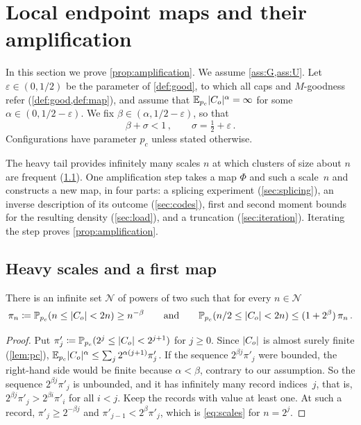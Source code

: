 \section{Local endpoint maps and their amplification}\label{sec:maps}

In this section we prove \cref{prop:amplification}. We assume \cref{ass:G,ass:U}. Let
$\varepsilon\in(0,1/2)$ be the parameter of \cref{def:good}, to which all caps and $M$-goodness refer
(\cref{def:good,def:map}), and assume that $\mathbb E_{p_c}\lvert C_o\rvert^\alpha=\infty$ for some
$\alpha\in(0,1/2-\varepsilon)$. We fix $\beta\in(\alpha,1/2-\varepsilon)$, so that
\begin{equation}\label{eq:beta-sigma}
  \beta+\sigma<1\,,\qquad\sigma=\tfrac12+\varepsilon\,.
\end{equation}
Configurations have parameter $p_c$ unless stated otherwise.

The heavy tail provides infinitely many scales $n$ at which clusters of size about $n$ are frequent
(\cref{sec:scales}). One amplification step takes a map $\Phi$ and such a scale~$n$ and constructs a new
map, in four parts: a splicing experiment (\cref{sec:splicing}), an inverse description of its outcome
(\cref{sec:codes}), first and second moment bounds for the resulting density (\cref{sec:load}), and a
truncation (\cref{sec:iteration}). Iterating the step proves \cref{prop:amplification}.

\subsection{Heavy scales and a first map}\label{sec:scales}

\begin{lemma}\label{lem:scales}
There is an infinite set $\mathcal N$ of powers of two such that for every $n\in\mathcal N$
\begin{equation}\label{eq:scales}
  \pi_n\coloneqq\mathbb P_{p_c}(n\le\lvert C_o\rvert<2n)\ge n^{-\beta}
  \qquad\text{and}\qquad
  \mathbb P_{p_c}(n/2\le\lvert C_o\rvert<2n)\le(1+2^\beta)\,\pi_n\,.
\end{equation}
\end{lemma}

\begin{proof}
Put $\pi'_j\coloneqq\mathbb P_{p_c}(2^j\le\lvert C_o\rvert<2^{j+1})$ for $j\ge0$. Since $\lvert C_o\rvert$ is almost surely
finite (\cref{lem:pc}), $\mathbb E_{p_c}\lvert C_o\rvert^\alpha\le\sum_j2^{\alpha(j+1)}\pi'_j$. If the sequence
$2^{\beta j}\pi'_j$ were bounded, the right-hand side would be finite because $\alpha<\beta$, contrary to
our assumption. So the sequence $2^{\beta j}\pi'_j$ is unbounded, and it has infinitely many
record indices~$j$, that is, $2^{\beta j}\pi'_j>2^{\beta i}\pi'_i$ for all $i<j$. Keep the records with
value at least one. At such a record, $\pi'_j\ge2^{-\beta j}$ and $\pi'_{j-1}<2^\beta\pi'_j$, which is
\eqref{eq:scales} for $n=2^j$.
\end{proof}

